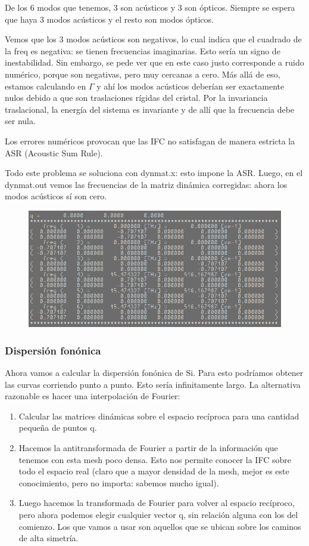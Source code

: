   De los 6 modos que tenemos, 3 son acústicos y 3 son ópticos. Siempre se espera que haya 3 modos acústicos y el resto son modos ópticos.

  Vemos que los 3 modos acústicos son negativos, lo cual indica que el cuadrado de la freq es negativa: se tienen frecuencias imaginarias. Esto sería un signo de inestabilidad. Sin embargo, se pede ver que en este caso justo corresponde a ruido numérico, porque son negativas, pero muy cercanas a cero. Más allá de eso, estamos calculando en $\Gamma$ y ahí los modos acústicos deberían ser exactamente nulos debido a que son traslaciones rígidas del cristal. Por la invariancia traslacional, la energía del sistema es invariante y de allí que la frecuencia debe ser nula.

  Los errores numéricos provocan que las IFC no satisfagan de manera estricta la ASR (Acoustic Sum Rule).

  Todo este problema se soluciona con dynmat.x: esto impone la ASR. Luego, en el dynmat.out vemos las frecuencias de la matriz dinámica corregidas: ahora los modos acústicos sí son cero.

  \begin{figure}[H]
    \centering
    \includegraphics[scale = 0.6]{figs/D5/ASR.png}
  \end{figure}

\subsubsection{Dispersión fonónica}

  Ahora vamos a calcular la dispersión fonónica de Si. Para esto podríamos obtener las curvas corriendo punto a punto. Esto sería infinitamente largo. La alternativa razonable es hacer una interpolación de Fourier:
    \begin{enumerate}
      \item Calcular las matrices dinámicas sobre el espacio recíproca para una cantidad pequeña de puntos q.
      \item Hacemos la antitransformada de Fourier a partir de la información que tenemos con esta mesh poco densa. Esto nos permite conocer la IFC sobre todo el espacio real (claro que a mayor densidad de la mesh, mejor es este conocimiento, pero no importa: sabemos mucho igual).
      \item Luego hacemos la transformada de Fourier para volver al espacio recíproco, pero ahora podemos elegir cualquier vector q, sin relación alguna con los del comienzo. Los que vamos a usar son aquellos que se ubican  sobre los caminos de alta simetría.
    \end{enumerate}

